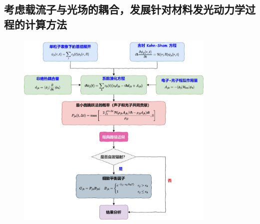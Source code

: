 {\subsection{考虑载流子与光场的耦合，发展针对材料发光动力学过程的计算方法}

  \begin{figure}
    \centering
    \captionsetup{width=0.85\textwidth}
    \includegraphics[width=0.85\textwidth]{figs/namd_emission_flowchart.pdf}
 \end{figure}


}
